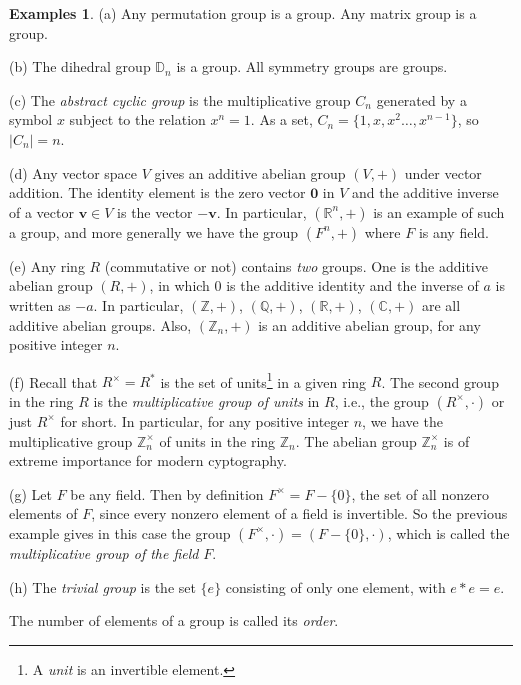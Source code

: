 \documentclass[11pt]{article}
\theoremstyle{definition}
\newtheorem{examples}[thm]{Examples}
\newcommand{\R}{\mathbb{R}} %
\newcommand{\C}{\mathbb{C}} %
\newcommand{\Z}{\mathbb{Z}} %
\newcommand{\Q}{\mathbb{Q}} %
\newcommand{\D}{\mathbb{D}}
\begin{document}
\begin{examples} \label{ex}
(a) Any permutation group is a group. Any matrix group is a group. 

(b) The dihedral group $\D_n$ is a group. All symmetry groups are
  groups.

(c) The \emph{abstract cyclic group} is the multiplicative group $C_n$
  generated by a symbol $x$ subject to the relation $x^n = 1$. As a
  set, $C_n = \{1, x, x^2 \dots, x^{n-1}\}$, so $|C_n| = n$.

(d) Any vector space $V$ gives an additive abelian
  group $(V,+)$ under vector addition. The identity element is the
  zero vector $\mathbf{0}$ in $V$ and the additive inverse of a vector
  $\mathbf{v} \in V$ is the vector $-\mathbf{v}$. In particular,
  $(\R^n, +)$ is an example of such a group, and more generally we
  have the group $(F^n, +)$ where $F$ is any field.

(e) Any ring $R$ (commutative or not) contains \emph{two}
  groups. One is the additive abelian group $(R,+)$, in which $0$ is
  the additive identity and the inverse of $a$ is written as $-a$. In
  particular, $(\Z, +)$, $(\Q, +)$, $(\R,+)$, $(\C, +)$ are all
  additive abelian groups. Also, $(\Z_n, +)$ is an additive abelian
  group, for any positive integer $n$.

(f) Recall that $R^\times = R^*$ is the set of
  units\footnote{A \emph{unit} is an invertible element.} in a given
  ring $R$. The second group in the ring $R$ is the
  \emph{multiplicative group of units} in $R$, i.e., the group
  $(R^\times, \cdot)$ or just $R^\times$ for short.  In particular,
  for any positive integer $n$, we have the multiplicative group
  $\Z_n^\times$ of units in the ring $\Z_n$. The abelian group
  $\Z_n^\times$ is of extreme importance for modern cyptography.

(g) Let $F$ be any field. Then by definition $F^\times =
  F-\{0\}$, the set of all nonzero elements of $F$, since every
  nonzero element of a field is invertible. So the previous example
  gives in this case the group $(F^\times, \cdot) = (F-\{0\}, \cdot)$,
  which is called the {\em multiplicative group of the field} $F$.

(h) The {\em trivial group} is the set $\{e\}$
  consisting of only one element, with $e*e=e$.
\end{examples}

The number of elements of a group is called its
\emph{order}.
\end{document}
